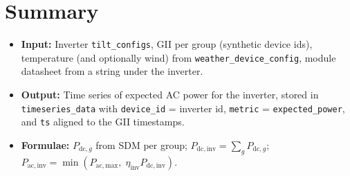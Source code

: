 \documentclass[11pt,a4paper]{article}
\begin{document}
\section{Summary}

\begin{itemize}
  \item \textbf{Input:} Inverter \texttt{tilt\_configs}, GII per group (synthetic device ids), temperature (and optionally wind) from \texttt{weather\_device\_config}, module datasheet from a string under the inverter.
  \item \textbf{Output:} Time series of expected AC power for the inverter, stored in \texttt{timeseries\_data} with \texttt{device\_id} = inverter id, \texttt{metric} = \texttt{expected\_power}, and \texttt{ts} aligned to the GII timestamps.
  \item \textbf{Formulae:} \(P_{\mathrm{dc},g}\) from SDM per group; \(P_{\mathrm{dc,inv}} = \sum_g P_{\mathrm{dc},g}\); \(P_{\mathrm{ac,inv}} = \min(P_{\mathrm{ac,max}},\; \eta_{\mathrm{inv}} P_{\mathrm{dc,inv}})\).
\end{itemize}
\end{document}
